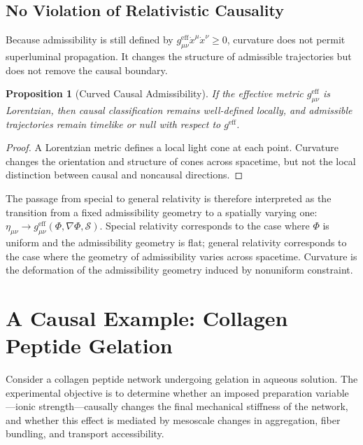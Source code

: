 \documentclass[11pt, a4paper, twocolumn]{article}
\newtheorem{proposition}[definition]{Proposition}
\newcommand{\Sfield}{\mathcal{S}}
\begin{document}
\subsection{No Violation of Relativistic Causality}

Because admissibility is still defined by
$g_{\mu\nu}^{\mathrm{eff}}\dot{x}^\mu\dot{x}^\nu \geq 0$, curvature does not
permit superluminal propagation. It changes the structure of admissible
trajectories but does not remove the causal boundary.

\begin{proposition}[Curved Causal Admissibility]
If the effective metric $g_{\mu\nu}^{\mathrm{eff}}$ is Lorentzian, then causal
classification remains well-defined locally, and admissible trajectories remain
timelike or null with respect to $g^{\mathrm{eff}}$.
\end{proposition}

\begin{proof}
A Lorentzian metric defines a local light cone at each point. Curvature changes
the orientation and structure of cones across spacetime, but not the local
distinction between causal and noncausal directions.
\end{proof}

The passage from special to general relativity is therefore interpreted as the
transition from a fixed admissibility geometry to a spatially varying one:
$\eta_{\mu\nu} \longrightarrow g_{\mu\nu}^{\mathrm{eff}}(\Phi,\nabla\Phi,\Sfield)$.
Special relativity corresponds to the case where $\Phi$ is uniform and the
admissibility geometry is flat; general relativity corresponds to the case where
the geometry of admissibility varies across spacetime. Curvature is the
deformation of the admissibility geometry induced by nonuniform constraint.

\section{A Causal Example: Collagen Peptide Gelation}

Consider a collagen peptide network undergoing gelation in aqueous solution.
The experimental objective is to determine whether an imposed preparation
variable---ionic strength---causally changes the final mechanical stiffness of
the network, and whether this effect is mediated by mesoscale changes in
aggregation, fiber bundling, and transport accessibility.
\end{document}
